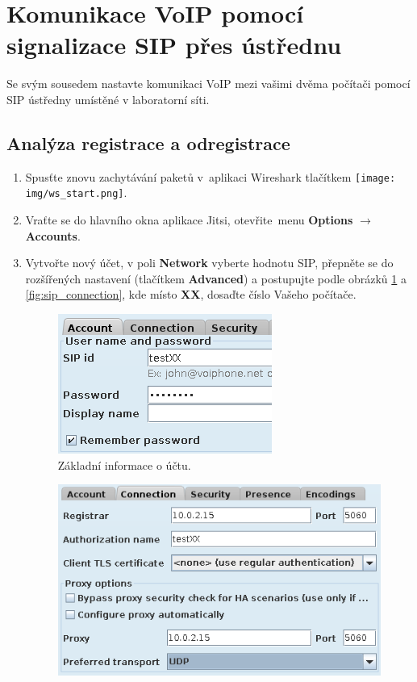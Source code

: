 \section{Komunikace VoIP pomocí signalizace SIP přes ústřednu}
Se svým sousedem nastavte komunikaci VoIP mezi vašimi dvěma počítači pomocí SIP ústředny umístěné v laboratorní síti.

\subsection{Analýza registrace a odregistrace}
\begin{enumerate}
    \item Spusťte znovu zachytávání paketů v aplikaci Wireshark tlačítkem \texttt{[image: img/ws\_start.png]}.
    \item Vraťte se do hlavního okna aplikace Jitsi, otevřite menu {\bf Options} $\rightarrow$ {\bf Accounts}.
    \item Vytvořte nový účet, v poli {\bf Network} vyberte hodnotu SIP, přepněte se do rozšířených nastavení (tlačítkem {\bf Advanced}) a postupujte podle obrázků \ref{fig:sip_account} a \ref{fig:sip_connection}, kde místo {\bf XX}, dosaďte číslo Vašeho počítače.\\
\begin{figure}[h!]
  \centering
  \includegraphics[scale=0.8]{img/sip_account.png}
  \caption{Základní informace o účtu.}
  \label{fig:sip_account}
\end{figure}
\begin{figure}[h!]
  \centering
  \includegraphics[scale=0.8]{img/sip_connection.png}

\end{figure}
\end{enumerate}
